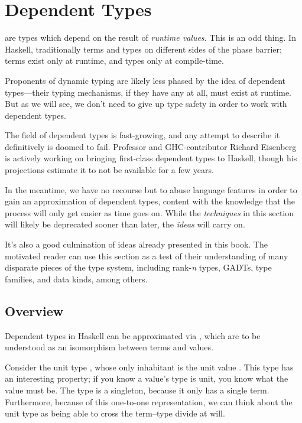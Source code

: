 \documentclass[book.tex]{subfiles}
\begin{document}
\chapter{Dependent Types}

 are types which depend on the result of
\emph{runtime values.} This is an odd thing. In Haskell, traditionally terms and
types on different sides of the phase barrier; terms exist only at runtime, and
types only at compile-time.

Proponents of dynamic typing are likely less phased by the idea of dependent
types---their typing mechanisms, if they have any at all, must exist at runtime.
But as we will see, we don't need to give up type safety in order to work with
dependent types.

The field of dependent types is fast-growing, and any attempt to describe it
definitively is doomed to fail. Professor and GHC-contributor Richard Eisenberg
is actively working on bringing first-class dependent types to Haskell, though
his projections estimate it to not be available for a few years.

In the meantime, we have no recourse but to abuse language features in order to
gain an approximation of dependent types, content with the knowledge that the
process will only get easier as time goes on. While the \emph{techniques} in
this section will likely be deprecated sooner than later, the \emph{ideas} will
carry on.

It's also a good culmination of ideas already presented in this book. The
motivated reader can use this section as a test of their understanding of many
disparate pieces of the type system, including rank-\emph{n} types, GADTs, type
families, and data kinds, among others.


\section{Overview}

Dependent types in Haskell can be approximated via
, which are to be understood as an \gls{isomorphism}
between terms and values.

Consider the unit type \ty{()}, whose only inhabitant is the unit value \hs{()}.
This type has an interesting property; if you know a value's type is unit, you
know what the value must be. The type \ty{()} is a singleton, because it only
has a single term. Furthermore, because of this one-to-one representation, we
can think about the unit type as being able to cross the term--type divide at
will.
\end{document}
